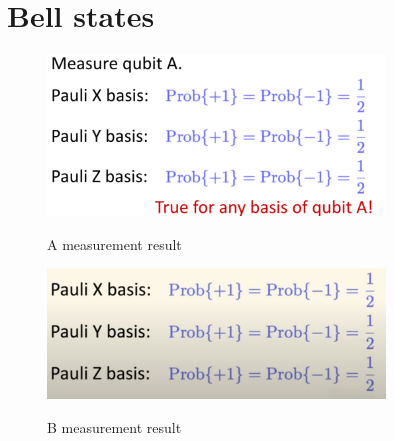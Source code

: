 \section{Bell states}

\begin{figure}[H]
    \centering
    \includegraphics[width=0.8\textwidth]{lesson4/Qubit_A.pdf}
    \label{fig: 1}
    \begin{center}
        \caption{A measurement result}
    \end{center}
\end{figure}

\begin{figure}[H]
    \centering
    \includegraphics[width=0.8\textwidth]{lesson4/Qubit_B.pdf}
    \label{fig: 1}
    \begin{center}
        \caption{B measurement result}
    \end{center}
\end{figure}
\fi

